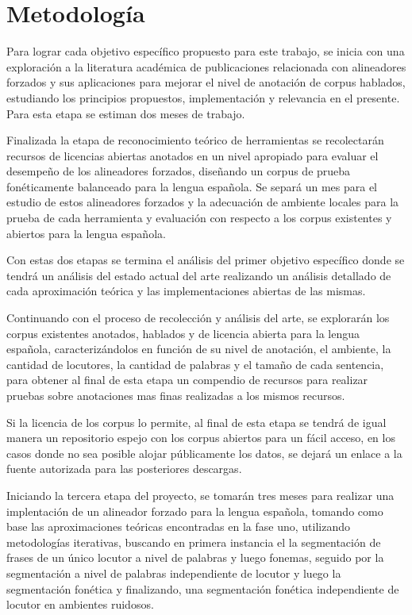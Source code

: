 \chapter{Metodología}


Para lograr cada objetivo específico propuesto para este trabajo, se inicia con una exploración a la literatura académica de publicaciones relacionada con alineadores forzados y sus aplicaciones para mejorar el nivel de anotación de corpus hablados, estudiando los principios propuestos, implementación y relevancia en el presente. Para esta etapa se estiman dos meses de trabajo.

Finalizada la etapa de reconocimiento teórico de herramientas se recolectarán recursos de licencias abiertas anotados en un nivel apropiado para evaluar el desempeño de los alineadores forzados, diseñando un corpus de prueba fonéticamente balanceado para la lengua española. Se separá un mes para el estudio de estos alineadores forzados y la adecuación de ambiente locales para la prueba de cada herramienta y evaluación con respecto a los corpus existentes y abiertos para la lengua española. 

Con estas dos etapas se termina el análisis del primer objetivo específico donde se tendrá un análisis del estado actual del arte realizando un análisis detallado de cada aproximación teórica y las implementaciones abiertas de las mismas.

Continuando con el proceso de recolección y análisis del arte, se explorarán los corpus existentes anotados, hablados y de licencia abierta para la lengua española, caracterizándolos en función de su nivel de anotación, el ambiente, la cantidad de locutores, la cantidad de palabras y el tamaño de cada sentencia, para obtener al final de esta etapa un compendio de recursos para realizar pruebas sobre anotaciones mas finas realizadas a los mismos recursos.

Si la licencia de los corpus lo permite, al final de esta etapa se tendrá de igual manera un repositorio espejo con los corpus abiertos para un fácil acceso, en los casos donde no sea posible alojar públicamente los datos, se dejará un enlace a la fuente autorizada para las posteriores descargas.

Iniciando la tercera etapa del proyecto, se tomarán tres meses para realizar una implentación de un alineador forzado para la lengua española, tomando como base las aproximaciones teóricas encontradas en la fase uno, utilizando metodologías iterativas, buscando en primera instancia el la segmentación de frases de un único locutor a nivel de palabras y luego fonemas, seguido por la segmentación a nivel de palabras independiente de locutor y luego la segmentación fonética y finalizando, una segmentación fonética independiente de locutor en ambientes ruidosos.

